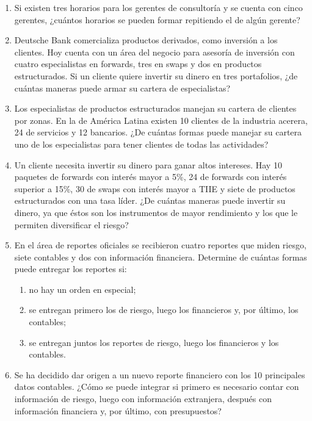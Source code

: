 \begin{Ejer}
\begin{enumerate}
\item Si existen tres horarios para los gerentes de consultor\'ia y se cuenta con cinco gerentes, ¿cu\'antos horarios se pueden formar repitiendo el de alg\'un gerente?

\item Deutsche Bank comercializa productos derivados, como inversi\'on a los clientes. Hoy cuenta con un \'area del negocio para asesor\'ia de inversi\'on con cuatro especialistas en forwards, tres en swaps y dos en productos estructurados. Si un cliente quiere invertir su dinero en tres portafolios, ¿de cu\'antas maneras puede armar su cartera de especialistas?

\item Los especialistas de productos estructurados manejan su cartera de clientes por zonas. En la de Am\'erica Latina existen 10 clientes de la industria acerera, 24 de servicios y 12 bancarios. ¿De cu\'antas formas puede manejar su cartera uno de los especialistas para tener clientes de todas las actividades?

\item Un cliente necesita invertir su dinero para ganar altos intereses. Hay 10 paquetes de forwards con inter\'es mayor a 5\%, 24 de forwards con inter\'es superior a 15\%, 30 de swaps con inter\'es mayor a TIIE y siete de productos estructurados con una tasa l\'ider. ¿De cu\'antas maneras puede invertir su dinero, ya que \'estos son los instrumentos de mayor rendimiento y los que le permiten diversificar el riesgo?

\item En el \'area de reportes oficiales se recibieron cuatro reportes que miden riesgo, siete contables y dos con informaci\'on financiera. Determine de cu\'antas formas puede entregar los reportes si:
\begin{enumerate}
\item no hay un orden en especial;
\item se entregan primero los de riesgo, luego los financieros y, por \'ultimo, los contables;
\item se entregan juntos los reportes de riesgo, luego los financieros y los contables.
\end{enumerate}

\item Se ha decidido dar origen a un nuevo reporte financiero con los 10 principales datos contables. ¿C\'omo se puede integrar si primero es necesario contar con informaci\'on de riesgo, luego con informaci\'on extranjera, despu\'es con informaci\'on financiera y, por \'ultimo, con presupuestos?


\end{enumerate}
\end{Ejer}

